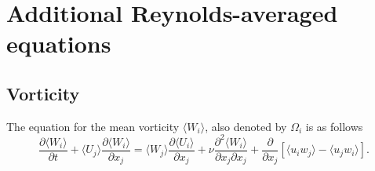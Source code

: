 \documentclass[oneside,a4paper,11pt]{report}
\newcommand{\uiavg}{\langle U_i \rangle}
\newcommand{\ujavg}{\langle U_j \rangle}
\newcommand{\uifluc}{u_i}
\newcommand{\ujfluc}{u_j}
\newcommand{\wiavg}{\langle W_i \rangle}
\newcommand{\wjavg}{\langle W_j \rangle}
\begin{document}
\section{Additional Reynolds-averaged equations}

\subsection{Vorticity}
The equation for the mean vorticity $\wiavg$, also denoted by $\Omega_i$ is as follows
\begin{equation}
\frac{\partial \wiavg}{\partial t} + \ujavg \frac{\partial \wiavg}{\partial x_j} = \wjavg \frac{\partial \uiavg}{\partial x_j} + \nu \frac{\partial^2 \wiavg}{\partial x_j \partial x_j} + \frac{\partial}{\partial x_j} [ \langle \uifluc w_j \rangle - \langle \ujfluc w_i \rangle ].
\end{equation}

\end{document}
